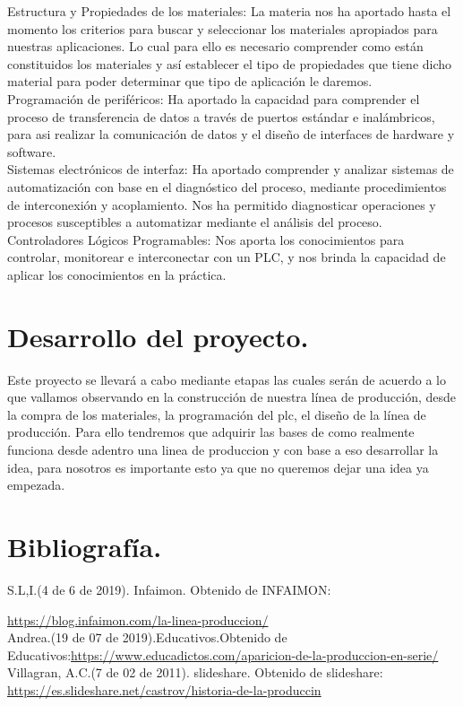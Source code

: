 \documentclass[10pt,a4paper]{article}
\begin{document}
Estructura y Propiedades de los materiales: La materia nos ha aportado hasta el momento los criterios para buscar y seleccionar los materiales apropiados para nuestras aplicaciones.  Lo cual para ello es necesario comprender como están constituidos los materiales y así establecer el tipo de propiedades que tiene dicho material para poder determinar que tipo de aplicación le daremos.\\

Programación de periféricos: Ha aportado la capacidad para comprender el proceso de transferencia de datos a través de puertos estándar e inalámbricos, para asi realizar la comunicación de datos y el diseño de interfaces de hardware y software.\\

Sistemas electrónicos de interfaz: Ha aportado comprender y analizar sistemas de automatización con base en el diagnóstico del proceso, mediante procedimientos de interconexión y acoplamiento. Nos ha permitido diagnosticar operaciones y procesos susceptibles a automatizar mediante el análisis del proceso. \\

Controladores Lógicos Programables: Nos aporta los conocimientos para controlar, monitorear e interconectar con un PLC, y nos brinda la capacidad de aplicar los conocimientos en la práctica.
\section{Desarrollo del proyecto.}
Este proyecto se llevará a cabo mediante etapas las cuales serán de acuerdo a lo que vallamos observando en la construcción de nuestra línea de producción, desde la compra de los materiales, la programación del plc, el diseño de la línea de producción. Para ello tendremos que adquirir las bases de como realmente funciona desde adentro una linea de produccion y con base a eso desarrollar la idea, para nosotros es importante esto ya que no queremos dejar una idea ya empezada. 
\\
\section{Bibliografía.}
S.L,I.(4 de 6 de 2019). Infaimon. Obtenido de INFAIMON:                           

\url{https://blog.infaimon.com/la-linea-produccion/}\\
\bigskip 
Andrea.(19 de 07 de 2019).Educativos.Obtenido de Educativos:\url{https://www.educadictos.com/aparicion-de-la-produccion-en-serie/}\\
\bigskip
Villagran, A.C.(7 de 02 de 2011). slideshare. Obtenido de slideshare: 
\url{https://es.slideshare.net/castrov/historia-de-la-produccin}
\end{document}
